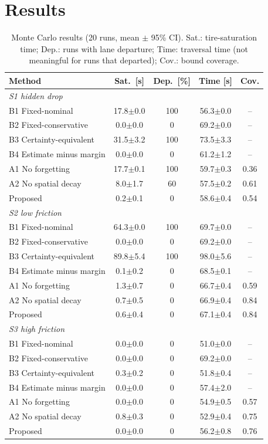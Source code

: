 \documentclass[letterpaper,journal,twoside]{IEEEtran}%
\begin{document}
\section{Results}\label{sec:results}
\begin{table}[t]
\centering\small
\caption{Monte Carlo results (20 runs, mean $\pm$ 95\% CI). Sat.: tire-saturation time; Dep.: runs with lane departure; Time: traversal time (not meaningful for runs that departed); Cov.: bound coverage.}
\label{tab:main}
\setlength{\tabcolsep}{3pt}
\begin{tabular}{lcccc}
\toprule
Method & Sat.\ [s] & Dep.\ [\%] & Time [s] & Cov.\\
\midrule
\multicolumn{5}{l}{\textit{S1 hidden drop}}\\
B1 Fixed-nominal & 17.8$\pm$0.0 & 100 & 56.3$\pm$0.0 & --\\
B2 Fixed-conservative & 0.0$\pm$0.0 & 0 & 69.2$\pm$0.0 & --\\
B3 Certainty-equivalent & 31.5$\pm$3.2 & 100 & 73.5$\pm$3.3 & --\\
B4 Estimate minus margin & 0.0$\pm$0.0 & 0 & 61.2$\pm$1.2 & --\\
A1 No forgetting & 17.7$\pm$0.1 & 100 & 59.7$\pm$0.3 & 0.36\\
A2 No spatial decay & 8.0$\pm$1.7 & 60 & 57.5$\pm$0.2 & 0.61\\
Proposed & 0.2$\pm$0.1 & 0 & 58.6$\pm$0.4 & 0.54\\
\midrule
\multicolumn{5}{l}{\textit{S2 low friction}}\\
B1 Fixed-nominal & 64.3$\pm$0.0 & 100 & 69.7$\pm$0.0 & --\\
B2 Fixed-conservative & 0.0$\pm$0.0 & 0 & 69.2$\pm$0.0 & --\\
B3 Certainty-equivalent & 89.8$\pm$5.4 & 100 & 98.0$\pm$5.6 & --\\
B4 Estimate minus margin & 0.1$\pm$0.2 & 0 & 68.5$\pm$0.1 & --\\
A1 No forgetting & 1.3$\pm$0.7 & 0 & 66.7$\pm$0.4 & 0.59\\
A2 No spatial decay & 0.7$\pm$0.5 & 0 & 66.9$\pm$0.4 & 0.84\\
Proposed & 0.6$\pm$0.4 & 0 & 67.1$\pm$0.4 & 0.84\\
\midrule
\multicolumn{5}{l}{\textit{S3 high friction}}\\
B1 Fixed-nominal & 0.0$\pm$0.0 & 0 & 51.0$\pm$0.0 & --\\
B2 Fixed-conservative & 0.0$\pm$0.0 & 0 & 69.2$\pm$0.0 & --\\
B3 Certainty-equivalent & 0.3$\pm$0.2 & 0 & 51.8$\pm$0.4 & --\\
B4 Estimate minus margin & 0.0$\pm$0.0 & 0 & 57.4$\pm$2.0 & --\\
A1 No forgetting & 0.0$\pm$0.0 & 0 & 54.9$\pm$0.5 & 0.57\\
A2 No spatial decay & 0.8$\pm$0.3 & 0 & 52.9$\pm$0.4 & 0.75\\
Proposed & 0.0$\pm$0.0 & 0 & 56.2$\pm$0.8 & 0.76\\
\bottomrule
\end{tabular}
\end{table}
\end{document}
